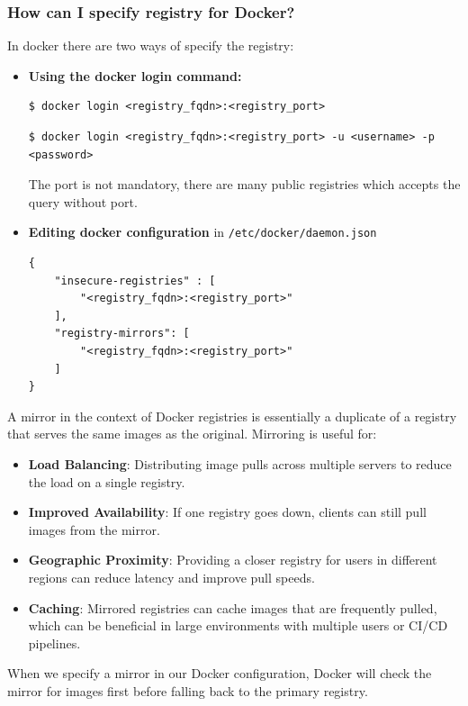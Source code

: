 \documentclass{article}
\newenvironment{blocktemplateI}[1]{%
    \tcolorbox[beamer,%
    noparskip,breakable,
    colframe=Violet,%
    colbacklower=Black,%
    title=#1]}%
    {\endtcolorbox}
\newenvironment{blocktemplateII}[1]{%
    \tcolorbox[beamer,%
    noparskip,breakable,
    colframe=Green,%
    colbacklower=LimeGreen!75!LightGreen,%
    title=#1]}%
    {\endtcolorbox}
\newenvironment{codetemplate}[1][]{%
  \mybasecolorbox[#1]
  \itshape
}{%
  \endmybasecolorbox
}
\begin{document}
\subsubsection{How can I specify registry for Docker?}
In docker there are two ways of specify the registry:
\begin{itemize}
    \item \textbf{Using the docker login command:}
\begin{codetemplate}{}
\begin{verbatim}
$ docker login <registry_fqdn>:<registry_port>
\end{verbatim}
\end{codetemplate}
\begin{codetemplate}{}
\begin{verbatim}
$ docker login <registry_fqdn>:<registry_port> -u <username> -p <password>
\end{verbatim}
\end{codetemplate}
\begin{blocktemplateI}{NOTE}
The port is not mandatory, there are many public registries which accepts the query without port.
\end{blocktemplateI}

    \item \textbf{Editing docker configuration} in \verb|/etc/docker/daemon.json|
\begin{codetemplate}{}
\begin{verbatim}
{
    "insecure-registries" : [
        "<registry_fqdn>:<registry_port>"
    ],
    "registry-mirrors": [
        "<registry_fqdn>:<registry_port>"
    ]
}
\end{verbatim}
\end{codetemplate}
\end{itemize}

\begin{blocktemplateII}{NOTE}
A mirror in the context of Docker registries is essentially a duplicate of a registry that serves the same images as the original. Mirroring is useful for:

\begin{itemize}
    \item \textbf{Load Balancing}: Distributing image pulls across multiple servers to reduce the load on a single registry.
    \item \textbf{Improved Availability}: If one registry goes down, clients can still pull images from the mirror.
    \item \textbf{Geographic Proximity}: Providing a closer registry for users in different regions can reduce latency and improve pull speeds.
    \item \textbf{Caching}: Mirrored registries can cache images that are frequently pulled, which can be beneficial in large environments with multiple users or CI/CD pipelines.
\end{itemize}

When we specify a mirror in our Docker configuration, Docker will check the mirror for images first before falling back to the primary registry.
\end{blocktemplateII}
\end{document}

